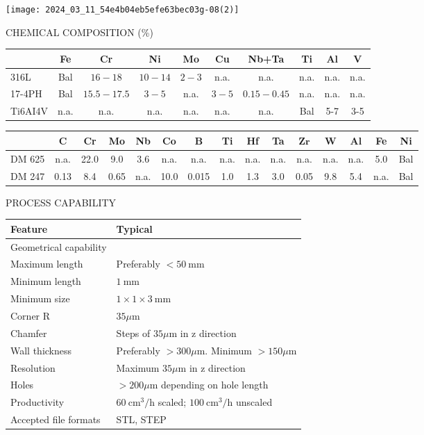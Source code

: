 \documentclass[10pt]{article}
\begin{document}
\begin{center}
\texttt{[image: 2024\_03\_11\_54e4b04eb5efe63bec03g-08(2)]}
\end{center}

CHEMICAL COMPOSITION (\%)

\begin{center}
\begin{tabular}{|l|c|c|c|c|c|c|c|c|c|}
\hline
 & Fe & Cr & Ni & Mo & Cu & Nb+Ta & Ti & Al & V \\
\hline
316L & Bal & $16-18$ & $10-14$ & $2-3$ & n.a. & n.a. & n.a. & n.a. & n.a. \\
\hline
17-4PH & Bal & $15.5-17.5$ & $3-5$ & n.a. & $3-5$ & $0.15-0.45$ & n.a. & n.a. & n.a. \\
\hline
Ti6AI4V & n.a. & n.a. & n.a. & n.a. & n.a. & n.a. & Bal & 5-7 & 3-5 \\
\hline
\end{tabular}
\end{center}

\begin{center}
\begin{tabular}{|l|c|c|c|c|c|c|c|c|c|c|c|c|c|c|}
\hline
 & C & Cr & Mo & Nb & Co & B & Ti & Hf & Ta & $\mathbf{Z r}$ & W & Al & Fe & Ni \\
\hline
DM 625 & n.a. & 22.0 & 9.0 & 3.6 & n.a. & n.a. & n.a. & n.a. & n.a. & n.a. & n.a. & n.a. & 5.0 & Bal \\
\hline
DM 247 & 0.13 & 8.4 & 0.65 & n.a. & 10.0 & 0.015 & 1.0 & 1.3 & 3.0 & 0.05 & 9.8 & 5.4 & n.a. & Bal \\
\hline
\end{tabular}
\end{center}

PROCESS CAPABILITY

\begin{center}
\begin{tabular}{|l|l|}
\hline
Feature & Typical \\
\hline
Geometrical capability &  \\
\hline
Maximum length & Preferably $<50 \mathrm{~mm}$ \\
\hline
Minimum length & $1 \mathrm{~mm}$ \\
\hline
Minimum size & $1 \times 1 \times 3 \mathrm{~mm}$ \\
\hline
Corner R & $35 \mu \mathrm{m}$ \\
\hline
Chamfer & Steps of $35 \mu \mathrm{m}$ in z direction \\
\hline
Wall thickness & Preferably $>300 \mu \mathrm{m}$. Minimum $>150 \mu \mathrm{m}$ \\
\hline
Resolution & Maximum $35 \mu \mathrm{m}$ in z direction \\
\hline
Holes & $>200 \mu \mathrm{m}$ depending on hole length \\
\hline
Productivity & $60 \mathrm{~cm}^{3} / \mathrm{h}$ scaled; $100 \mathrm{~cm}^{3} / \mathrm{h}$ unscaled \\
\hline
Accepted file formats & STL, STEP \\
\hline
\end{tabular}
\end{center}
\end{document}
